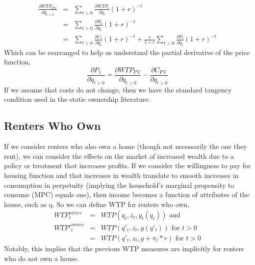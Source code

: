 \documentclass[ecta,nameyear,draft]{econsocart}
\theoremstyle{plain}
\theoremstyle{remark}
\begin{document}
\begin{eqnarray}
\frac{\partial \mathit{WTP}_{\mathrm{PV}}}{\partial q_{t>0}}&=&\sum_{t>0} \frac{\partial \mathit{WTP}_t}{\partial q_t}(1+r)^{-t}\\ \label{pvmwtp}
&=&\sum_{t>0} \frac{\partial R_t}{\partial q_t}(1+r)^{-t}\nonumber\\
&=&\sum_{t>0} \frac{\partial C_t}{\partial q_t}(1+r)^{-t}+\frac{r}{1+r}\sum_{t>0} \frac{\partial P_t}{\partial q_t}(1+r)^{-t}\nonumber
\end{eqnarray}
Which can be rearranged to help us understand the partial derivative of the price function,
\begin{equation}
	\frac{\partial P_1} {\partial q_{t>0}}=\frac{\partial \mathit{WTP}_{\mathrm{PV}}}{\partial q_{t>0}}-\frac{\partial C_{\mathrm{PV}}}{\partial q_{t>0}} \label{marginalPrice}
\end{equation}
If we assume that costs do not change, then we have the standard tangency condition used in the static ownership literature.

\subsection{Renters Who Own}
If we consider renters who also own a home (though not necessarily the one they rent), we can consider the effects on the market of increased wealth due to a policy or treatment that increases profits. If we consider the willingness to pay for housing function and that increases in wealth translate to smooth increases in consumption in perpetuity (implying the household's marginal propensity to consume (MPC) equals one), then income becomes a function of attributes of the house, such as q. So we can define WTP for renters who own,
\begin{eqnarray*}	
	\mathit{WTP}_t^{\mathit{owner}}&=&\mathit{WTP}(q_t,z_t,y_t(q_t)) \text{ and} \\
	\mathit{WTP'}_t^{\mathit{owner}}&=&\mathit{WTP}(q'_t,z_t,y(q'_t)) \text{ for } t>0\\
	&=&	\mathit{WTP}(q'_t,z_t,y+\pi_t*r) \text{ for } t>0
\end{eqnarray*}
Notably, this implies that the previous WTP measures are implicitly for renters who do not own a house.
\end{document}
